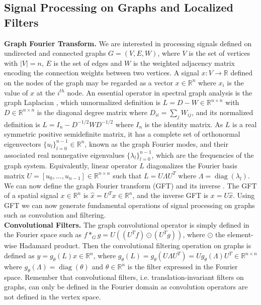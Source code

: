 \documentclass{article}
\DeclareMathOperator*{\diag}{diag}
\begin{document}
\subsection{Signal Processing on Graphs and Localized Filters}
\vspace{-0.2cm}
{\bf Graph Fourier Transform.} We are interested in processing signals defined on undirected and connected graphs $G=(V,E,W)$, where $V$ is the set of vertices with $|V|=n$, $E$ is the set of edges and $W$ is the weighted adjacency matrix encoding the connection weights between two vertices. A signal $x:V\rightarrow\mathbb{R}$ defined on the nodes of the graph may be regarded as a vector $x\in\mathbb{R}^n$ where $x_i$ is the value of $x$ at the $i^{th}$ node. An essential operator in spectral graph analysis is the graph Laplacian \cite{book:Chung97Spectral}, which unnormalized definition is $L=D-W\in\mathbb{R}^{n\times n}$ with $D\in\mathbb{R}^{n\times n}$ is the diagonal degree matrix where $D_{ii}=\sum_jW_{ij}$, and its normalized definition is $L=I_n-D^{-1/2}WD^{-1/2}$ where $I_n$ is the identity matrix. As $L$ is a real symmetric positive semidefinite matrix, it has a complete set of orthonormal eigenvectors $\{u_l\}_{l=0}^{n-1}\in\mathbb{R}^n$, known as the graph Fourier modes, and their associated real nonnegative eigenvalues $\{\lambda_l\}_{l=0}^{n-1}$, which are the frequencies of the graph system. Equivalently, linear operator $L$ diagonalizes the Fourier basis matrix $U=[u_0,...,u_{n-1}]\in\mathbb{R}^{n\times n}$ such that $L=U\Lambda U^T$ where $\Lambda=\diag(\lambda_l)$. We can now define the graph Fourier transform (GFT) and its inverse \cite{art:ShumanNarangFrossardOrtegaVandergheynst13ReviewSPG}. The GFT of a spatial signal $x\in\mathbb{R}^n$ is $\hat{x}=U^Tx\in\mathbb{R}^n$, and the inverse GFT is $x=U\hat{x}$. Using GFT we can now generate fundamental operations of signal processing on graphs such as convolution and filtering. \\
{\bf Convolutional Filters.} The graph convolutional operator is simply defined in the Fourier space such as $f\ast_G g=U((U^Tf) \odot (U^Tg))$, where $\odot$ the element-wise Hadamard product. Then the convolutional filtering operation on graphs is defined as $y=g_\theta(L)x\in\mathbb{R}^n$, where $g_\theta(L)=g_\theta(U\Lambda U^T)=Ug_\theta(\Lambda) U^T\in\mathbb{R}^{n\times n}$ where $g_\theta(\Lambda)=\diag(\theta)$ and $\theta\in\mathbb{R}^n$ is the filter expressed in the Fourier space. Remember that convolutional filters, i.e. translation-invariant filters on graphs, can only be defined in the Fourier domain as convolution operators are not defined in the vertex space. \\
\end{document}
